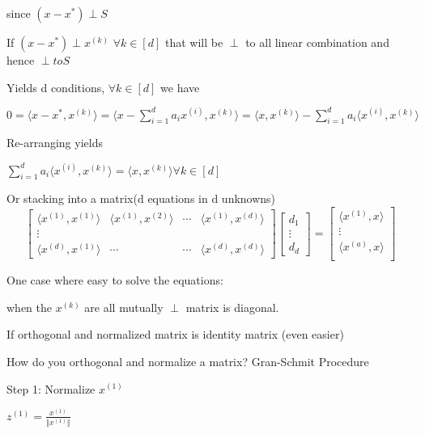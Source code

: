 since $(x-x^{*}) \perp S$

If $(x-x^{*}) \perp x^{(k)}$ $\forall k\in [d]$ that will be $\perp$ to all linear combination and hence $\perp to S$

Yields d conditions, $\forall k\in [d]$ we have

$0=\langle x-x^{*},x^{(k)}\rangle=\langle x-\sum_{i=1}^{d}a_{i}x^{(i)},x^{(k)}\rangle=\langle x,x^{(k)}\rangle-\sum_{i=1}^{d}a_{i}\langle x^{(i)},x^{(k)}\rangle$

Re-arranging yields

$\sum_{i=1}^{d}a_{i}\langle x^{(i)},x^{(k)}\rangle=\langle x,x^{(k)}\rangle \forall k\in [d]$

Or stacking into a matrix(d equations in d unknowns)
$$\left[ 
\begin{array}{cccc} 
\langle x^{(1)},x^{(1)}\rangle & \langle x^{(1)},x^{(2)}\rangle &\cdots& \langle x^{(1)},x^{(d)}\rangle\\
\vdots&&& \\
\langle x^{(d)},x^{(1)}\rangle & \cdots &\cdots& \langle x^{(d)},x^{(d)}\rangle
\end{array}
\right]
\left[ 
\begin{array}{c} 
d_{1}\\
\vdots\\
d_{d}
\end{array}
\right]=
\left[ 
\begin{array}{c} 
\langle x^{(1)},x\rangle\\
\vdots\\
\langle x^{(a)},x\rangle\\
\end{array}
\right]$$


One case where easy to solve the equations:

when the $x^{(k)}$ are all mutually $\perp$ matrix is diagonal.

If orthogonal and normalized matrix is identity matrix (even easier)

How do you orthogonal and normalize a matrix? Gran-Schmit Procedure

\begin{marginfigure}
	\centering
	\resizebox{7.5cm}{3cm}{}
	\caption{}
	\label{}
\end{marginfigure}

Step 1: Normalize $x^{(1)}$

$z^{(1)}=\frac{x^{(1)}}{\Vert x^{(1)}\Vert}$

\begin{marginfigure}
	\centering
	\resizebox{7.5cm}{3cm}{}
	\caption{}
	\label{}
\end{marginfigure}

